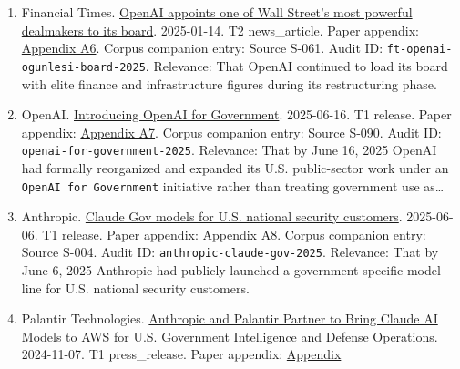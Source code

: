 \documentclass[
  american,
  11pt,
  letterpaper,
]{article}
\begin{document}
\begin{enumerate}
  company\_statement. Paper appendix:
  \hyperref[appendix-a5-openai-board-forms-safety-and-security-committee]{Appendix
  A5}. Corpus companion entry: Source S-089. Audit ID:
  \texttt{openai-board-forms-safety-security-committee-2024}. Relevance:
  That OpenAI publicly moved safety and security oversight to a named
  board-level structure after the governance crisis.
\item
  Financial Times.
  \href{https://www.ft.com/content/63b08a9d-e537-4d60-9904-c59958a16982}{OpenAI
  appoints one of Wall Street's most powerful dealmakers to its board}.
  2025-01-14. T2 news\_article. Paper appendix:
  \hyperref[appendix-a6-openai-appoints-one-of-wall-street-s-most-powerful-dealmakers-to-its-board]{Appendix
  A6}. Corpus companion entry: Source S-061. Audit ID:
  \texttt{ft-openai-ogunlesi-board-2025}. Relevance: That OpenAI
  continued to load its board with elite finance and infrastructure
  figures during its restructuring phase.
\item
  OpenAI.
  \href{https://openai.com/global-affairs/introducing-openai-for-government/}{Introducing
  OpenAI for Government}. 2025-06-16. T1 release. Paper appendix:
  \hyperref[appendix-a7-introducing-openai-for-government]{Appendix A7}.
  Corpus companion entry: Source S-090. Audit ID:
  \texttt{openai-for-government-2025}. Relevance: That by June 16, 2025
  OpenAI had formally reorganized and expanded its U.S. public-sector
  work under an \texttt{OpenAI\ for\ Government} initiative rather than
  treating government use as\ldots{}
\item
  Anthropic.
  \href{https://www.anthropic.com/news/claude-gov-models-for-u-s-national-security-customers}{Claude
  Gov models for U.S. national security customers}. 2025-06-06. T1
  release. Paper appendix:
  \hyperref[appendix-a8-claude-gov-models-for-u-s-national-security-customers]{Appendix
  A8}. Corpus companion entry: Source S-004. Audit ID:
  \texttt{anthropic-claude-gov-2025}. Relevance: That by June 6, 2025
  Anthropic had publicly launched a government-specific model line for
  U.S. national security customers.
\item
  Palantir Technologies.
  \href{https://investors.palantir.com/news-details/2024/Anthropic-and-Palantir-Partner-to-Bring-Claude-AI-Models-to-AWS-for-U.S.-Government-Intelligence-and-Defense-Operations/}{Anthropic
  and Palantir Partner to Bring Claude AI Models to AWS for U.S.
  Government Intelligence and Defense Operations}. 2024-11-07. T1
  press\_release. Paper appendix:
  \hyperref[appendix-a9-anthropic-and-palantir-partner-to-bring-claude-ai-models-to-aws-for-u-s-government-intelligence-and-defense-operations]{Appendix
}
\end{enumerate}
\end{document}

